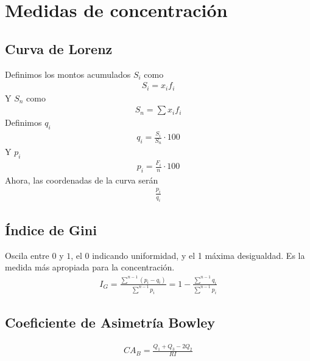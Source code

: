 \documentclass{article}
\begin{document}
\section{Medidas de concentración}
\subsection{Curva de Lorenz}
Definimos los montos acumulados $S_i$ como
\begin{equation}
    \begin{split}
        S_i=x_i f_i
    \end{split}
\end{equation}
Y $S_n$ como
\begin{equation}
    \begin{split}
        S_n=\sum x_i f_i
    \end{split}
\end{equation}
Definimos $q_i$
\begin{equation}
    \begin{split}
        q_i = \frac{S_i}{S_n} \cdot 100
    \end{split}
\end{equation}
Y $p_i$
\begin{equation}
    \begin{split}
        p_i= \frac{F_i}{n} \cdot 100
    \end{split}
\end{equation}
Ahora, las coordenadas de la curva serán
\begin{equation}
    \begin{split}
        \frac{p_i}{q_i}
    \end{split}
\end{equation}
\subsection{Índice de Gini}
Oscila entre $0$ y $1$, el 0 indicando uniformidad, y el 1 máxima desigualdad. Es la medida más
apropiada para la concentración.
\begin{equation}
    \begin{split}
        I_G= \frac{\sum^{n-1} (p_i-q_i)}{\sum ^{n-1} p_i}= 1-\frac{\sum^{n-1} q_i}{\sum ^{n-1} p_i}
    \end{split}
\end{equation}
\subsection{Coeficiente de Asimetría Bowley}
\begin{equation}
    \begin{split}
        CA_B= \frac{Q_1+Q_3-2Q_2}{RI}
    \end{split}
\end{equation}
\end{document}
